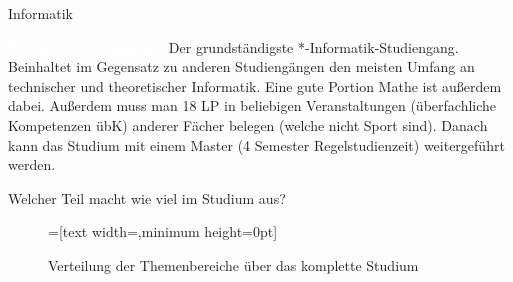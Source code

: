
\begin{Huge}
    Informatik
\end{Huge}
\begin{exampleblock}{\textcolor{white}{Was ist der Studiengang?}}
    Der grundständigste *-Informatik-Studiengang. Beinhaltet im Gegensatz zu anderen Studiengängen den meisten Umfang an technischer und theoretischer Informatik. Eine gute Portion Mathe ist außerdem dabei. Außerdem muss man 18 LP in beliebigen Veranstaltungen (überfachliche Kompetenzen übK) anderer Fächer belegen (welche nicht Sport sind). Danach kann das Studium mit einem Master (4 Semester Regelstudienzeit) weitergeführt werden.
\end{exampleblock}	

\begin{block}{Welcher Teil macht wie viel im Studium aus?}
    \begin{figure}[h!]
        \begin{minipage}{\linewidth}
            \centering
            =[text width={},minimum height=0pt]
        \end{minipage}
        
        \caption{Verteilung der Themenbereiche über das komplette Studium}
    \end{figure}	
\end{block}%

